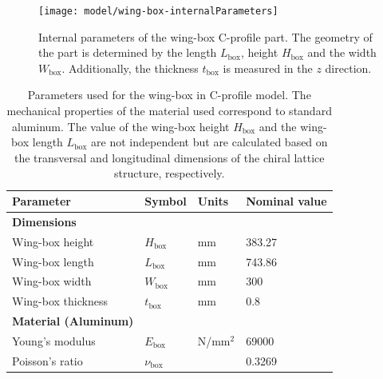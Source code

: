     \begin{figure}[!htpb]
      \centering
      \texttt{[image: model/wing-box-internalParameters]}
      \caption[Internal parameters of the wing-box in C-profile part]{Internal parameters of the wing-box C-profile part. The geometry of the part is determined by the length $L_{\mathrm{box}}$, height $H_{\mathrm{box}}$ and the width $W_{\mathrm{box}}$. Additionally, the thickness $t_{\mathrm{box}}$ is measured in the $z$ direction.}\label{fig:wing-box-internalParameters}
    \end{figure}

    \begin{table}[!htpb]
    \centering
    \begin{tabular}{|l|lll|}
    \hline
    \textbf{Parameter} & \multicolumn{1}{l|}{\textbf{Symbol}} & \multicolumn{1}{l|}{\textbf{Units}} & \textbf{Nominal value} \\ \hline \hline
    {\textbf{Dimensions}} &  &  &  \\ \hline
    Wing-box height & \multicolumn{1}{l|}{$H_{\mathrm{box}}$} & \multicolumn{1}{l|}{mm} & 383.27 \\ \hline
    Wing-box length & \multicolumn{1}{l|}{$L_{\mathrm{box}}$} & \multicolumn{1}{l|}{mm} & 743.86 \\ \hline
    Wing-box width & \multicolumn{1}{l|}{$W_{\mathrm{box}}$} & \multicolumn{1}{l|}{mm} & 300 \\ \hline
    Wing-box thickness & \multicolumn{1}{l|}{$t_{\mathrm{box}}$} & \multicolumn{1}{l|}{mm} & 0.8 \\ \hline \hline
    {\textbf{Material (Aluminum)}} &  &  &  \\ \hline
    Young's modulus & \multicolumn{1}{l|}{$E_{\mathrm{box}}$} & \multicolumn{1}{l|}{N/mm$^2$} & 69000 \\ \hline
    Poisson's ratio & \multicolumn{1}{l|}{$\nu_{\mathrm{box}}$} & \multicolumn{1}{l|}{} & 0.3269 \\ \hline
    \end{tabular}
    \caption[Parameters used for the wing-box in C-profile model]{Parameters used for the wing-box in C-profile model. The mechanical properties of the material used correspond to standard aluminum. The value of the wing-box height $H_{\mathrm{box}}$ and the wing-box length $L_{\mathrm{box}}$ are not independent but are calculated based on the transversal and longitudinal dimensions of the chiral lattice structure, respectively.}
    \label{tab:parameters_wing-box}
    \end{table}

